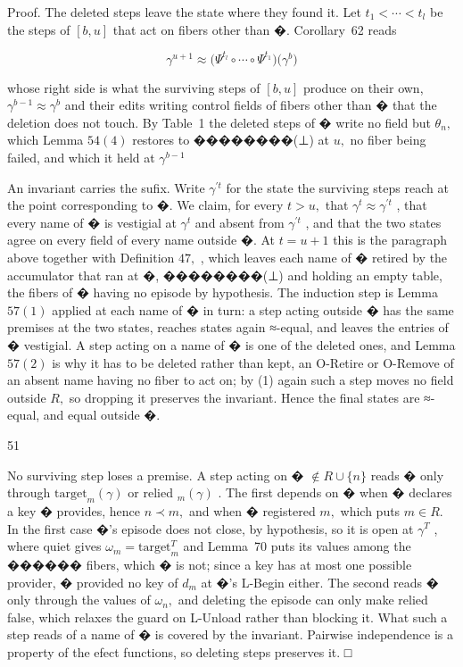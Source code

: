 \documentclass[
  10
]{article}
\begin{document}
Proof. The deleted steps leave the state where they found it. Let
\(t _ { 1 } < \cdots < t _ { l }\) be the steps of \([ b , u ]\) that
act on fibers other than �. Corollary~62 reads

\[
\gamma ^ { u + 1 } \approx \bigl ( \Psi ^ { t _ { l } } \circ \cdots \circ \Psi ^ { t _ { 1 } } \bigr ) \bigl ( \gamma ^ { b } \bigr )
\]

whose right side is what the surviving steps of \([ b , u ]\) produce on
their own, \(\gamma ^ { b - 1 } \approx \gamma ^ { b }\) and their edits
writing control fields of fibers other than � that the deletion does not
touch. By Table~1 the deleted steps of � write no field but
\(\theta _ { n } ,\) which Lemma \(5 4 ( 4 )\) restores to ��������(⊥)
at \(u ,\) no fiber being failed, and which it held at
\(\gamma ^ { b - 1 }\)

An invariant carries the sufix. Write \(\gamma ^ { \prime t }\) for the
state the surviving steps reach at the point corresponding to �. We
claim, for every \(t > u ,\) that
\(\gamma ^ { t } \approx \gamma ^ { \prime t }\) , that every name of �
is vestigial at \(\gamma ^ { t }\) and absent from
\(\gamma ^ { \prime t }\) , and that the two states agree on every field
of every name outside �. At \(t = u + 1\) this is the paragraph above
together with Definition \(4 7 ,\) , which leaves each name of � retired
by the accumulator that ran at �, ��������(⊥) and holding an empty
table, the fibers of � having no episode by hypothesis. The induction
step is Lemma \(5 7 ( 1 )\) applied at each name of � in turn: a step
acting outside � has the same premises at the two states, reaches states
again ≈-equal, and leaves the entries of � vestigial. A step acting on a
name of � is one of the deleted ones, and Lemma \(5 7 ( 2 )\) is why it
has to be deleted rather than kept, an O-Retire or O-Remove of an absent
name having no fiber to act on; by (1) again such a step moves no field
outside \(R ,\) so dropping it preserves the invariant. Hence the final
states are ≈-equal, and equal outside �.

51

No surviving step loses a premise. A step acting on �
\(\not \in R \cup \{ n \}\) reads � only through
\(\mathrm { t a r g e t } _ { m } ( \gamma )\) or relied
\(_ m ( \gamma )\) . The first depends on � when � declares a key �
provides, hence \(n \prec m ,\) and when � registered \(m ,\) which puts
\(m \in R .\) In the first case �'s episode does not close, by
hypothesis, so it is open at \(\gamma ^ { T }\) , where quiet gives
\(\omega _ { m } = \mathrm { t a r g e t } _ { m } ^ { T }\) and
Lemma~70 puts its values among the ������ fibers, which � is not; since
a key has at most one possible provider, � provided no key of
\(d _ { m }\) at �'s L-Begin either. The second reads � only through the
values of \(\omega _ { n } ,\) and deleting the episode can only make
relied false, which relaxes the guard on L-Unload rather than blocking
it. What such a step reads of a name of � is covered by the invariant.
Pairwise independence is a property of the efect functions, so deleting
steps preserves it. □
\end{document}
